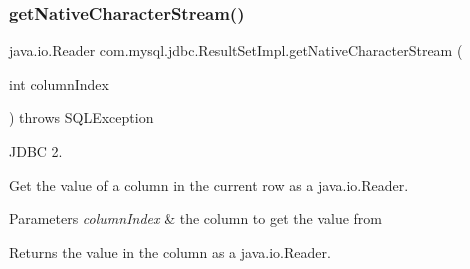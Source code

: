 \subsubsection{\texorpdfstring{get\+Native\+Character\+Stream()}{getNativeCharacterStream()}}
{\footnotesize\ttfamily java.\+io.\+Reader com.\+mysql.\+jdbc.\+Result\+Set\+Impl.\+get\+Native\+Character\+Stream (\begin{DoxyParamCaption}\item[{int}]{column\+Index }\end{DoxyParamCaption}) throws S\+Q\+L\+Exception\hspace{0.3cm}{\ttfamily [protected]}}

J\+D\+BC 2.

Get the value of a column in the current row as a java.\+io.\+Reader. 


\begin{DoxyParams}{Parameters}
{\em column\+Index} & the column to get the value from\\
\hline
\end{DoxyParams}
\begin{DoxyReturn}{Returns}
the value in the column as a java.\+io.\+Reader.
\end{DoxyReturn}

